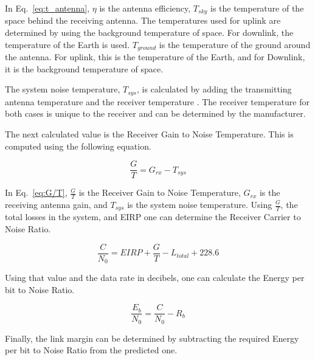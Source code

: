 \documentclass[12pt]{article}
\begin{document}
In Eq.~\ref{eq:t_antenna}, $\eta$ is the antenna efficiency, $T_{sky}$ is the temperature of the space behind the receiving antenna. The temperatures used for uplink are determined by using the background temperature of space. For downlink, the temperature of the Earth is used. $T_{ground}$ is the temperature of the ground around the antenna. For uplink, this is the temperature of the Earth, and for Downlink, it is the background temperature of space.

The system noise temperature, $T_{sys}$, is calculated by adding the transmitting antenna temperature and the receiver temperature \cite{pozar}. The receiver temperature for both cases is unique to the receiver and can be determined by the manufacturer.

The next calculated value is the Receiver Gain to Noise Temperature. This is computed \cite{SMAD} using the following equation.

\begin{equation}\label{eq:G/T}
\frac{G}{T} =  G_{rx} - T_{sys} 
\end{equation}

In Eq.~\ref{eq:G/T}, $\frac{G}{T}$ is the Receiver Gain to Noise Temperature, $G_{rx}$ is the receiving antenna gain, and $T_{sys}$ is the system noise temperature. Using $\frac{G}{T}$, the total losses in the system, and EIRP one can determine \cite{SMAD} the Receiver Carrier to Noise Ratio.

\begin{equation}\label{eq:c/n}
\frac{C}{N_0} = EIRP + \frac{G}{T} - L_{total} + 228.6 
\end{equation}

Using that value and the data rate in decibels, one can calculate \cite{SMAD} the Energy per bit to Noise Ratio.

\begin{equation}\label{eq:eb/n}
\frac{E_b}{N_0} = \frac{C}{N_0} - R_b 
\end{equation}

Finally, the link margin can be determined by subtracting the required Energy per bit to Noise Ratio from the predicted one. 
\end{document}
